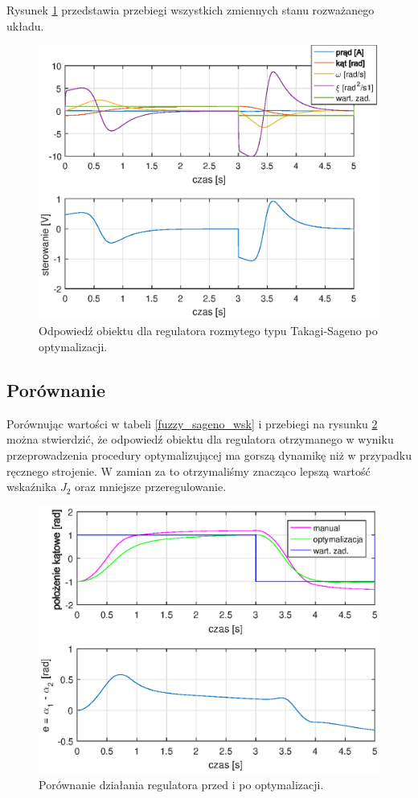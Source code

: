 \FloatBarrier
Rysunek \ref{fuzzy_sageno_odp} przedstawia przebiegi wszystkich zmiennych stanu rozważanego układu.
\begin{figure}[h!]
	\centering
	\includegraphics[scale = 1]{fig/fuzzy_sagenoOpt_odp.eps}
	\caption		
	{Odpowied\'z obiektu dla regulatora rozmytego typu Takagi-Sageno po optymalizacji.}
	\label{fuzzy_sageno_odp}
\end{figure}
\FloatBarrier
\newpage
\subsection{Porównanie}

Porównując wartości w tabeli \ref{fuzzy_sageno_wsk} i przebiegi na rysunku \ref{fuzzy_sageno_por} można stwierdzić, że odpowied\'z obiektu dla regulatora otrzymanego w wyniku przeprowadzenia procedury optymalizującej ma gorszą dynamikę niż w przypadku ręcznego strojenie. W zamian za to otrzymaliśmy znacząco lepszą wartość wska\'znika $J_2$ oraz mniejsze przeregulowanie.
\begin{figure}[h!]
	\centering
	\includegraphics[scale = 0.8]{fig/por_fuzzy_sageno.eps}
	\caption		
	{Porównanie działania regulatora przed i po optymalizacji.}
	\label{fuzzy_sageno_por}
\end{figure}

